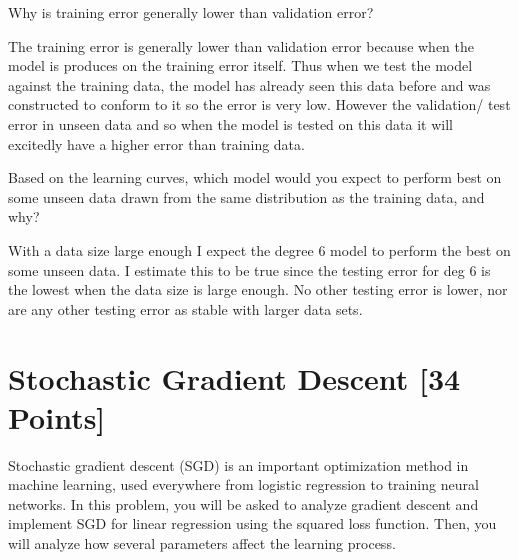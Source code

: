 \begin{problem}[3]
  Why is training error generally lower than validation error?
\end{problem}
\begin{solution}
  The training error is generally lower than validation error because when the model is produces on the training error itself. Thus when we test the model against the training data, the model has already seen this data before and was constructed to conform to it so the error is very low. However the validation/ test error in unseen data and so when the model is tested on this data it will excitedly have a higher error than training data.
\end{solution}

\begin{problem}[3]
  Based on the learning curves, which model would you expect to perform best on some unseen data drawn from the same distribution as the training data, and why?
\end{problem}
\begin{solution}
  With a data size large enough I expect the degree 6 model to perform the best on some unseen data. I estimate this to be true since the testing error for deg 6 is the lowest when the data size is large enough. No other testing error is lower, nor are any other testing error as stable with larger data sets.
\end{solution}





\newpage
\section{Stochastic Gradient Descent [34 Points]}

Stochastic gradient descent (SGD) is an important optimization method in machine learning, used everywhere from logistic regression to training neural networks. In this problem, you will be asked to analyze gradient descent and implement SGD for linear regression using the squared loss function. Then, you will analyze how several parameters affect the learning process.

